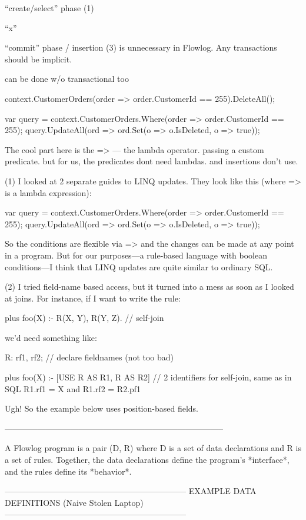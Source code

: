 ``create/select'' phase (1)

``x''

``commit'' phase / insertion (3) is unnecessary in Flowlog. Any transactions should be implicit.


can be done w/o transactional too

context.CustomerOrders(order => order.CustomerId == 255).DeleteAll();

var query = context.CustomerOrders.Where(order => order.CustomerId == 255);
query.UpdateAll(ord => ord.Set(o => o.IsDeleted, o => true));

The cool part here is the => --- the lambda operator.
passing a custom predicate. but for us, the predicates dont need lambdas. and insertions don't use. 







(1) I looked at 2 separate guides to LINQ updates. They look like this
(where => is a lambda expression):

var query = context.CustomerOrders.Where(order => order.CustomerId == 255);
query.UpdateAll(ord => ord.Set(o => o.IsDeleted, o => true));

So the conditions are flexible via => and the changes can be made at
any point in a program. But for our purposes---a rule-based language
with boolean conditions---I think that LINQ updates are quite similar
to ordinary SQL.

(2) I tried field-name based access, but it turned into a mess as soon
as I looked at joins. For instance, if I want to write the rule:

plus foo(X) :- R(X, Y), R(Y, Z). // self-join

we'd need something like:

R: rf1, rf2;  // declare fieldnames (not too bad)

plus foo(X) :- 
  [USE R AS R1, R AS R2] // 2 identifiers for self-join, same as in SQL
  R1.rf1 = X and
  R1.rf2 = R2.pf1
  
Ugh! So the example below uses position-based fields.

--------------------------------------------------------------------------------

A Flowlog program is a pair (D, R) where D is a set of data
declarations and R is a set of rules. Together, the data declarations
define the program's *interface*, and the rules define its *behavior*.

------------------------------------------------------------------
EXAMPLE DATA DEFINITIONS (Naive Stolen Laptop)
------------------------------------------------------------------

